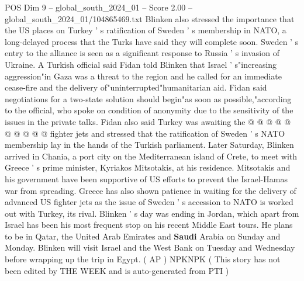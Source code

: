 \begin{textsample}{POS Dim 9 – global\_south\_2024\_01 – Score 2.00 – global\_south\_2024\_01/104865469.txt}
Blinken also stressed the importance that the US places on Turkey ' s ratification of Sweden ' s membership in NATO, a long-delayed process that the Turks have said they will complete soon.
Sweden ' s entry to the alliance is seen as a significant response to Russia ' s invasion of Ukraine.
A Turkish official said Fidan told Blinken that Israel ' s"increasing aggression"in Gaza was a threat to the region and he called for an immediate cease-fire and the delivery of"uninterrupted"humanitarian aid.
Fidan said negotiations for a two-state solution should begin"as soon as possible,"according to the official, who spoke on condition of anonymity due to the sensitivity of the issues in the private talks.
Fidan also said Turkey was awaiting the @ @ @ @ @ @ @ @ @ @ fighter jets and stressed that the ratification of Sweden ' s NATO membership lay in the hands of the Turkish parliament.
Later Saturday, Blinken arrived in Chania, a port city on the Mediterranean island of Crete, to meet with Greece ' s prime minister, Kyriakos Mitsotakis, at his residence.
Mitsotakis and his government have been supportive of US efforts to prevent the Israel-Hamas war from spreading.
Greece has also shown patience in waiting for the delivery of advanced US fighter jets as the issue of Sweden ' s accession to NATO is worked out with Turkey, its rival.
Blinken ' s day was ending in Jordan, which apart from Israel has been his most frequent stop on his recent Middle East tours.
He plans to be in Qatar, the United Arab Emirates and \textbf{Saudi} Arabia on Sunday and Monday.
Blinken will visit Israel and the West Bank on Tuesday and Wednesday before wrapping up the trip in Egypt. ( AP ) NPKNPK ( This story has not been edited by THE WEEK and is auto-generated from PTI )

\end{textsample}

